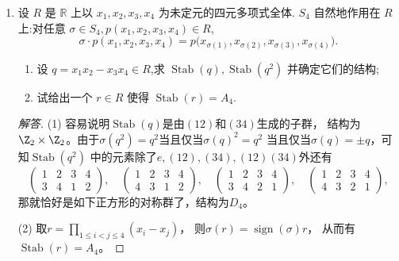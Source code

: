 \begin{enumerate}
\begin{proof}[解答]
    (3) $H$是${\rm GL}_3(\R)$中所有形如
    $\begin{pmatrix}*&*&0\\*&*&0\\*&*&1\end{pmatrix}$的方阵全体。
\end{proof}
\item 设 $R$ 是 $\mathbb{R}$ 上以 $x_1 , x_2 , x_3 , x_4$ 为未定元的四元多项式全体. 
$S_4$ 自然地作用在 $R$ 上:对任意 $\sigma \in S_4 , p(x_1 , x_2 , x_3 , x_4) \in R$,
\[\sigma \cdot p(x_1 , x_2 , x_3 , x_4) = p\big(x_{\sigma(1)}, x_{\sigma(2)}, x_{\sigma(3)}, x_{\sigma(4)}\big).\]
\begin{enumerate}[label=(\arabic*)]
\item 设 $q = x_1 x_2 - x_3 x_4 \in R$,求 $\operatorname{Stab}(q), \operatorname{Stab}(q^2)$ 并确定它们的结构;
\item 试给出一个 $r \in R$ 使得 $\operatorname{Stab}(r) = A_4$.
\end{enumerate}
\begin{proof}[解答]
    (1) 容易说明$\operatorname{Stab}(q)$是由$(12)$和$(34)$生成的子群，
    结构为$\Z_2\times\Z_2$。由于$\sigma(q^2)=q^2$当且仅当$\sigma(q)^2=q^2$
    当且仅当$\sigma(q)=\pm q$，可知$\operatorname{Stab}(q^2)$
    中的元素除了$e,(12),(34),(12)(34)$外还有
    \[\begin{pmatrix}1&2&3&4\\3&4&1&2\end{pmatrix},\quad
    \begin{pmatrix}1&2&3&4\\4&3&1&2\end{pmatrix},\quad
    \begin{pmatrix}1&2&3&4\\3&4&2&1\end{pmatrix},\quad
    \begin{pmatrix}1&2&3&4\\4&3&2&1\end{pmatrix},\]
    那就恰好是如下正方形的对称群了，结构为$D_4$。
    (2) 取$\displaystyle r=\prod_{1\leqslant i<j \leqslant4}(x_i-x_j)$，
    则$\sigma(r)=\operatorname{sign}(\sigma)r$，
    从而有$\operatorname{Stab}(r)=A_4$。
\end{proof}

\end{enumerate}

